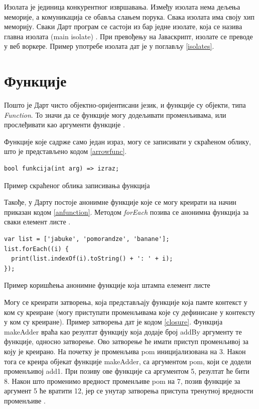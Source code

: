 \documentclass[12pt,oneside]{memoir}
\begin{document}
Изолата је јединица конкурентног извршавања. Између изолата нема дељења меморије, а комуникација се обавља слањем порука. Свака изолата има своју хип меморију. Сваки Дарт програм се састоји из бар једне изолате, која се назива главна изолата (main isolate) \cite{dart, dart1}. При превођењу на Јаваскрипт, изолате се преводе у веб воркере. Пример употребе изолата дат је у поглављу \ref{isolates}.

\section{Функције}
\label{funkcije}
Пошто је Дарт чисто објектно-оријентисани језик, и функције су објекти, типа \textit{Function}. То значи да се функције могу додељивати променљивама, или прослеђивати као аргументи функције \cite{dart, dart1}.

Функције које садрже само један израз, могу се записивати у скраћеном облику, што је представљено кодом \ref{arrowfunc}. 
\begin{listing}
\begin{verbatim}
bool funkcija(int arg) => izraz;
\end{verbatim}
\caption{Пример скраћеног облика записивања функција}
\label{arrowfunc}
\end{listing}

Такође, у Дарту постоје анонимне функције које се могу креирати на начин приказан кодом \ref{anfunction}. Методом \textit{forEach} позива се анонимна функција за сваки елемент листе \cite{dart, dart1}.

\begin{listing}
\begin{verbatim}
var list = ['jabuke', 'pomorandze', 'banane'];
list.forEach((i) {
  print(list.indexOf(i).toString() + ': ' + i);
});
\end{verbatim}
\caption{Пример коришћења анонимне функције која штампа елемент листе}
\label{anfunction}
\end{listing}

Могу се креирати затворења, која представљају функције која памте контекст у ком су креиране (могу приступати променљивама које су дефинисане у контексту у ком су креиране). Пример затворења дат је кодом \ref{closure}. Функција makeAdder враћа као резултат функцију која додаје број addBy аргументу те функције, односно затворење. Ово затворење ће имати приступ променљивој за коју је креирано. На почетку је променљива pom иницијализована на 3. Након тога се креира објекат функције makeAdder, са аргументом pom, који се додели променљивој add1. При позиву ове функције са аргументом 5, резултат ће бити 8. Након што променимо вредност променљиве pom на 7, позив функције за аргумент 5 ће вратити 12, јер се унутар затворења приступа тренутној вредности променљиве \cite{dart, dart1}.
\end{document}
